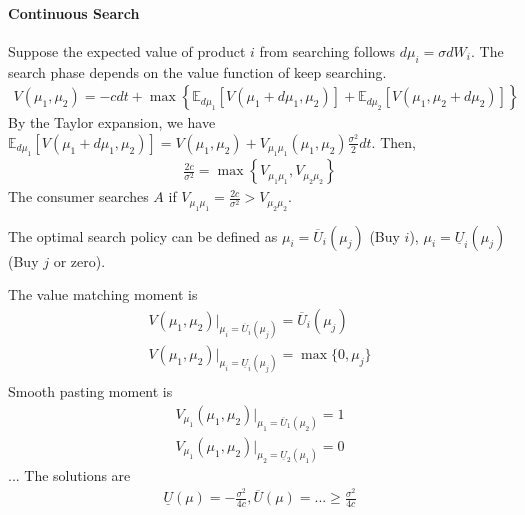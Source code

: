 \documentclass[11pt]{elegantbook}
\begin{document}
\paragraph*{Continuous Search}
Suppose the expected value of product $i$ from searching follows $d\mu_i=\sigma dW_i$. The search phase depends on the value function of keep searching.
\begin{equation}
    \begin{aligned}
        V(\mu_1,\mu_2)=-cdt+\max\left\{\mathbb{E}_{d\mu_1}\left[V(\mu_1+d\mu_1,\mu_2)\right]+\mathbb{E}_{d\mu_2}\left[V(\mu_1,\mu_2+d\mu_2)\right]\right\}
    \end{aligned}
    \nonumber
\end{equation}
By the Taylor expansion, we have $\mathbb{E}_{d\mu_1}\left[V(\mu_1+d\mu_1,\mu_2)\right]=V(\mu_1,\mu_2)+V_{\mu_1\mu_1}\left(\mu_1,\mu_2\right)\frac{\sigma^2}{2}dt$. Then,
\begin{equation}
    \begin{aligned}
        \frac{2c}{\sigma^2}=\max\left\{V_{\mu_1\mu_1},V_{\mu_2\mu_2}\right\}
    \end{aligned}
    \nonumber
\end{equation}
The consumer searches $A$ if $V_{\mu_1\mu_1}=\frac{2c}{\sigma^2}>V_{\mu_2\mu_2}$.


The optimal search policy can be defined as $\mu_i=\overline{U}_i(\mu_j)$ (Buy $i$), $\mu_i=\underline{U}_i(\mu_j)$ (Buy $j$ or zero).

The value matching moment is
\begin{equation}
    \begin{aligned}
        V(\mu_1,\mu_2)\bigg|_{\mu_i=\overline{U}_i(\mu_j)}=\overline{U}_i(\mu_j)\\
        V(\mu_1,\mu_2)\bigg|_{\mu_i=\underline{U}_i(\mu_j)}=\max\{0,\mu_j\}\\
    \end{aligned}
    \nonumber
\end{equation}
Smooth pasting moment is
\begin{equation}
    \begin{aligned}
        V_{\mu_1}(\mu_1,\mu_2)\bigg|_{\mu_1=\overline{U}_1(\mu_2)}=1\\
        V_{\mu_1}(\mu_1,\mu_2)\bigg|_{\mu_2=\underline{U}_2(\mu_1)}=0
    \end{aligned}
    \nonumber
\end{equation}
...
The solutions are
\begin{equation}
    \begin{aligned}
        \underline{U}(\mu)=-\frac{\sigma^2}{4c}, \overline{U}(\mu)=...\geq \frac{\sigma^2}{4c}
    \end{aligned}
    \nonumber
\end{equation}
\end{document}

